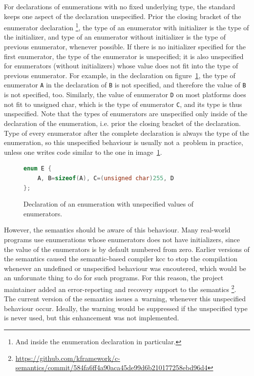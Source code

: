 \documentclass{fithesis3}
\begin{document}
For declarations of enumerations with no fixed underlying type, the standard keeps one aspect of the declaration unspecified. Prior the closing bracket of the enumerator declaration
\footnote{And inside the enumeration declaration in particular.},
the type of an enumerator with initializer is the type of the initializer, and type of an enumerator without initializer is the type of previous enumerator, whenever possible. If there is no initializer specified for the first enumerator, the type of the enumerator is unspecified; it is also unspecified for enumerators (without initializers) whose value does not fit into the type of previous enumerator. 
For example, in the declaration on figure~\ref{fig:ugly-enum}, the type of enumerator \lstinline{A} in the declaration of \lstinline{B} is not specified, and therefore the value of \lstinline{B} is not specified, too. Similarly, the value of enumerator \lstinline{D} on most platforms does not fit to unsigned char, which is the type of enumerator \lstinline{C}, and its type is thus unspecified. Note that the types of enumerators are unspecified only inside of the declaration of the enumeration, i.e. prior the closing bracket of the declaration. Type of every enumerator after the complete declaration is always the type of the enumeration, so this unspecified behaviour is usually not a~problem in practice, unless one writes code similar to the one in image~\ref{fig:ugly-enum}.

\begin{figure}[h]
\begin{lstlisting}[language=C++]
enum E {
	A, B=sizeof(A), C=(unsigned char)255, D
};
\end{lstlisting}
\caption{Declaration of an enumeration with unspecified values of enumerators.}
\label{fig:ugly-enum}
\end{figure}

However, the semantics should be aware of this behaviour. Many real-world programs use enumerations whose enumerators does not have initializers, since the value of the enumerators is by default numbered from zero. Earlier versions of the semantics caused the semantic-based compiler kcc to stop the compilation whenever an undefined or unspecified behaviour was encoutered, which would be an unforunate thing to do for such programs. For this reason, the project maintainer added an error-reporting and recovery support to the semantics \footnote{\url{https://github.com/kframework/c-semantics/commit/584fa6ff4a90aca45de99d6b210177258ebd96d4}}. The current version of the semantics issues a~warning, whenever this unspecified behaviour occur. Ideally, the warning would be suppressed if the unspecified type is never used, but this enhancement was not implemented.
\end{document}
